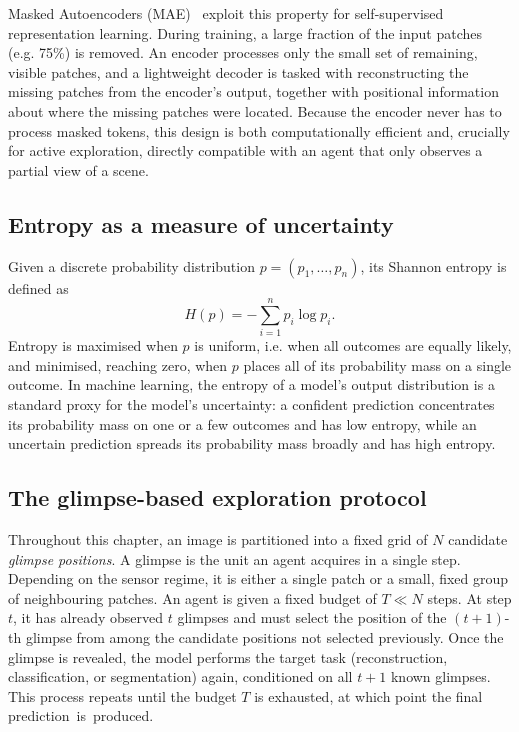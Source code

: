 Masked Autoencoders (MAE)~\cite{he2022masked} exploit this property for self-supervised representation learning. During training, a large fraction of the input patches (e.g. 75\%) is removed. An encoder processes only the small set of remaining, visible patches, and a lightweight decoder is tasked with reconstructing the missing patches from the encoder's output, together with positional information about where the missing patches were located. Because the encoder never has to process masked tokens, this design is both computationally efficient and, crucially for active exploration, directly compatible with an agent that only observes a partial view of a scene.

\subsection{Entropy as a measure of uncertainty}
\label{sec:prelim-entropy}

Given a discrete probability distribution $p = (p_1, \dots, p_n)$, its Shannon entropy is defined as
\begin{equation}
    H(p) = -\sum_{i=1}^n p_i \log p_i .
    \label{eq:shannon-entropy}
\end{equation}
Entropy is maximised when $p$ is uniform, i.e. when all outcomes are equally likely, and minimised, reaching zero, when $p$ places all of its probability mass on a single outcome. In machine learning, the entropy of a model's output distribution is a standard proxy for the model's uncertainty: a confident prediction concentrates its probability mass on one or a few outcomes and has low entropy, while an uncertain prediction spreads its probability mass broadly and has high entropy.

\subsection{The glimpse-based exploration protocol}
\label{sec:prelim-glimpse-protocol}

Throughout this chapter, an image is partitioned into a fixed grid of $N$ candidate \emph{glimpse positions}. A glimpse is the unit an agent acquires in a single step. Depending on the sensor regime, it is either a single patch or a small, fixed group of neighbouring patches. An agent is given a fixed budget of $T \ll N$ steps. At step $t$, it has already observed $t$ glimpses and must select the position of the $(t+1)$-th glimpse from among the candidate positions not selected previously. Once the glimpse is revealed, the model performs the target task (reconstruction, classification, or segmentation) again, conditioned on all $t+1$ known glimpses. This process repeats until the budget $T$ is exhausted, at which point the final prediction~is~produced.


